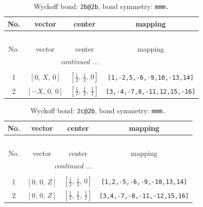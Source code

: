 \documentclass[fleqn,8pt]{jsarticle}
\begin{document}
\renewcommand{\arraystretch}{1.2}
\begin{longtable}{cccc}
\caption{Wyckoff bond: {\tt 2b@2b}, bond symmetry: {\tt mmm.}}
 \\
 \hline \hline
No. & vector & center & mapping \\ \hline \endfirsthead

\multicolumn{3}{l}{\tablename\ \thetable{}} \\
 \hline \hline
No. & vector & center & mapping \\ \hline \endhead

 \hline \hline
\multicolumn{3}{r}{\footnotesize\it continued ...} \\ \endfoot

 \hline \hline
\multicolumn{3}{r}{} \\ \endlastfoot

1 & $\left[ 0,\, X,\, 0 \right]$ & $\left[ \frac{1}{2},\, \frac{1}{2},\, 0 \right]$ & {\tt [1,-2,5,-6,-9,10,-13,14]} \\ \hline
2 & $\left[ - X,\, 0,\, 0 \right]$ & $\left[ \frac{1}{2},\, \frac{1}{2},\, \frac{1}{2} \right]$ & {\tt [3,-4,-7,8,-11,12,15,-16]} \\
\end{longtable}
\renewcommand{\arraystretch}{1.2}
\begin{longtable}{cccc}
\caption{Wyckoff bond: {\tt 2c@2b}, bond symmetry: {\tt mmm.}}
 \\
 \hline \hline
No. & vector & center & mapping \\ \hline \endfirsthead

\multicolumn{3}{l}{\tablename\ \thetable{}} \\
 \hline \hline
No. & vector & center & mapping \\ \hline \endhead

 \hline \hline
\multicolumn{3}{r}{\footnotesize\it continued ...} \\ \endfoot

 \hline \hline
\multicolumn{3}{r}{} \\ \endlastfoot

1 & $\left[ 0,\, 0,\, Z \right]$ & $\left[ \frac{1}{2},\, \frac{1}{2},\, 0 \right]$ & {\tt [1,2,-5,-6,-9,-10,13,14]} \\ \hline
2 & $\left[ 0,\, 0,\, Z \right]$ & $\left[ \frac{1}{2},\, \frac{1}{2},\, \frac{1}{2} \right]$ & {\tt [3,4,-7,-8,-11,-12,15,16]} \\
\end{longtable}
\renewcommand{\arraystretch}{1.2}
\end{document}
